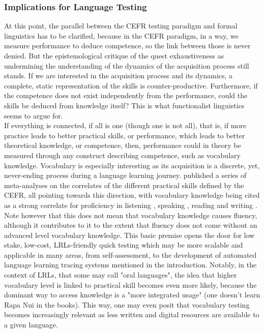         \subsubsection{Implications for Language Testing}
At this point, the parallel between the CEFR testing paradigm and formal linguistics has to be clarified, because in the CEFR paradigm, in a way, we measure performance to deduce competence, so the link between those is never denied. But the epistemological critique of the quest exhaustiveness as undermining the understanding of the dynamics of the acquisition process still stands. If we are interested in the acquisition process and its dynamics, a complete, static representation of the skills is counter-productive. Furthermore, if the competence does not exist independently from the performance, could the skills be deduced from knowledge itself? This is what functionalist linguistics seems to argue for.\\
If everything is connected, if all is one (though one is not all), that is, if more practice leads to better practical skills, or performance, which leads to better theoretical knowledge, or competence, then, performance could in theory be measured through any construct describing competence, such as vocabulary knowledge. Vocabulary is especially interesting as its acquisition is a discrete, yet, never-ending process during a language learning journey. \textcite{eun_hee_jeon_understanding_2022} published a series of meta-analyses on the correlates of the different practical skills defined by the CEFR, all pointing towards this direction, with vocabulary knowledge being cited as a strong correlate for proficiency in listening \parencite{innami_meta-analysis_2022}, speaking \parencite{jeon_meta-analysis_2022}, reading \parencite{jeon_updated_2022} and writing \parencite{kojima_meta-analysis_2022}. Note however that this does not mean that vocabulary knowledge causes fluency, although it contributes to it to the extent that fluency does not come without an advanced level vocabulary knowledge. This basic premise opens the door for low stake, low-cost, LRLs-friendly quick testing which may be more scalable and applicable in many areas, from self-assessment, to the development of automated language learning tracing systems mentioned in the introduction. Notably, in the context of LRLs, that some may call "oral languages", the idea that higher vocabulary level is linked to practical skill becomes even more likely, because the dominant way to access knowledge is a "more integrated usage" (one doesn't learn Rapa Nui in the books). This way, one may even posit that vocabulary testing becomes increasingly relevant as less written and digital resources are available to a given language. \\
